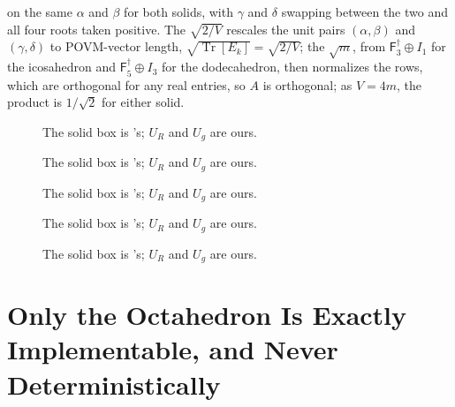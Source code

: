 \documentclass[11pt, oneside, openany]{scrbook}
\DeclareMathOperator{\Tr}{Tr}
\begin{document}
on the same $\alpha$ and $\beta$ for both solids, with $\gamma$ and $\delta$ swapping between the two and all four roots taken positive. The $\sqrt{2/V}$ rescales the unit pairs $(\alpha, \beta)$ and $(\gamma, \delta)$ to POVM-vector length, $\sqrt{\Tr[E_k]} = \sqrt{2/V}$; the $\sqrt{m}$, from $\mathsf{F}_3^\dagger \oplus I_1$ for the icosahedron and $\mathsf{F}_5^\dagger \oplus I_3$ for the dodecahedron, then normalizes the rows, which are orthogonal for any real entries, so $A$ is orthogonal; as $V = 4m$, the product is $1/\sqrt{2}$ for either solid.

\makeatletter\setlength\@fptop{0pt}\makeatother%
\begin{figure}[p]

\caption{The solid box is \textcite[Fig.~7]{decker2004quantumcircuitssinglequbit}'s; $U_R$ and $U_g$ are ours.}
\label{fig:dec_tet_circuit}
\end{figure}

\begin{figure}[p]

\caption{The solid box is \textcite[Fig.~11]{decker2004quantumcircuitssinglequbit}'s; $U_R$ and $U_g$ are ours.}
\label{fig:dec_oct_circuit}
\end{figure}

\begin{figure}[p]

\caption{The solid box is \textcite[Fig.~9]{decker2004quantumcircuitssinglequbit}'s; $U_R$ and $U_g$ are ours.}
\label{fig:dec_cube_circuit}
\end{figure}

\begin{figure}[p]

\caption{The solid box is \textcite[Fig.~15]{decker2004quantumcircuitssinglequbit}'s; $U_R$ and $U_g$ are ours.}
\label{fig:dec_icos_circuit}
\end{figure}

\begin{figure}[p]

\caption{The solid box is \textcite[Fig.~13]{decker2004quantumcircuitssinglequbit}'s; $U_R$ and $U_g$ are ours.}
\label{fig:dec_dodec_circuit}
\end{figure}

\clearpage %
\makeatletter\setlength{}\makeatother%
\section{Only the Octahedron Is Exactly Implementable, and Never Deterministically} \label{sec:decker:exactness}
\end{document}
